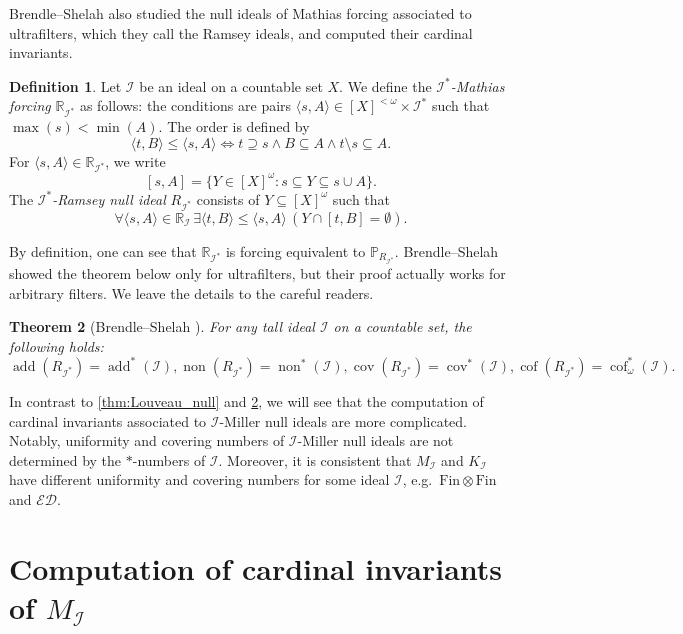 \documentclass[a4paper,12pt]{amsart}
\newtheorem{thm}{Theorem}
\theoremstyle{definition}
\newtheorem{dfn}[thm]{Definition}
\numberwithin{thm}{section}
\numberwithin{equation}{section}
\DeclareMathOperator{\non}{non}
\DeclareMathOperator{\cov}{cov}
\DeclareMathOperator{\add}{add}
\DeclareMathOperator{\cof}{cof}
\newcommand{\ed}{\mathcal{ED}}
\newcommand{\I}{\mathscr{I}}
\newcommand{\finfin}{\mathrm{Fin}\otimes\mathrm{Fin}}
\renewcommand{\subset}{\subseteq}
\begin{document}
    Brendle--Shelah \cite{BS99} also studied the null ideals of Mathias forcing associated to ultrafilters, which they call the Ramsey ideals, and computed their cardinal invariants. 

    \begin{dfn}
        Let $\I$ be an ideal on a countable set $X$. We define the \emph{$\I^*$-Mathias forcing} $\mathbb{R}_{\I^*}$ as follows: the conditions are pairs $\langle s, A\rangle\in[X]^{<\omega}\times\I^*$ such that $\max(s)<\min(A)$. The order is defined by
        \[
        \langle t, B\rangle\leq\langle s, A\rangle \iff t\supseteq s\land B\subset A\land t\setminus s\subset A.
        \]
        For $\langle s, A\rangle\in\mathbb{R}_{\I^*}$, we write
        \[
        [s, A] = \{Y\in[X]^\omega: s\subset Y\subset s\cup A\}.
        \]
        The \emph{$\I^*$-Ramsey null ideal} $R_{\I^*}$ consists of $Y\subset[X]^\omega$ such that
        \[
        \forall\langle s, A\rangle\in\mathbb{R}_\I\,\exists\langle t, B\rangle\leq\langle s, A\rangle\,(Y\cap[t, B] = \emptyset).
        \]
    \end{dfn}

    By definition, one can see that $\mathbb{R}_{\I^*}$ is forcing equivalent to $\mathbb{P}_{R_{\I^*}}$. Brendle--Shelah \cite{BS99} showed the theorem below only for ultrafilters, but their proof actually works for arbitrary filters. We leave the details to the careful readers.

    \begin{thm}[Brendle--Shelah {\cite[Theorem 1]{BS99}}]\label{thm:ramsey_null}
        For any tall ideal $\I$ on a countable set, the following holds:
        \[
        \add(R_{\I^*}) = \add^*(\I), \non(R_{\I^*}) = \non^*(\I), \cov(R_{\I^*}) = \cov^*(\I), \cof(R_{\I^*}) = \cof^*_\omega(\I).
        \]
    \end{thm}

    In contrast to \cref{thm:Louveau_null} and \cref{thm:ramsey_null}, we will see that the computation of cardinal invariants associated to $\I$-Miller null ideals are more complicated. Notably, uniformity and covering numbers of $\I$-Miller null ideals are not determined by the $*$-numbers of $\I$. Moreover, it is consistent that $M_\I$ and $K_\I$ have different uniformity and covering numbers for some ideal $\I$, e.g.\ $\finfin$ and $\ed$.


    \section{Computation of cardinal invariants of $M_\I$}\label{sec:ZFC}
\end{document}
